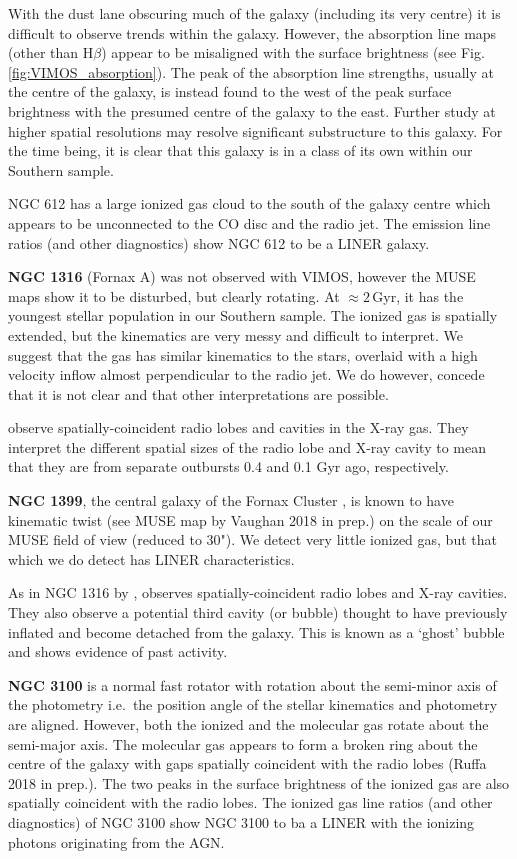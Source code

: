 With the dust lane obscuring much of the galaxy (including its very centre) it is difficult to observe trends within the galaxy. However, the absorption line maps (other than H$\beta$) appear to be misaligned with the surface brightness (see Fig.\,\ref{fig:VIMOS_absorption}). The peak of the absorption line strengths, usually at the centre of the galaxy, is instead found to the west of the peak surface brightness with the presumed centre of the galaxy to the east. Further study at higher spatial resolutions may resolve significant substructure to this galaxy. For the time being, it is clear that this galaxy is in a class of its own within our Southern sample. 

NGC 612 has a large ionized gas cloud to the south of the galaxy centre which appears to be unconnected to the CO disc and the radio jet. The emission line ratios (and other diagnostics) show NGC 612 to be a LINER galaxy. 

\textbf{NGC 1316} (Fornax A) was not observed with VIMOS, however the MUSE maps show it to be disturbed, but clearly rotating. At $\approx 2$\,Gyr, it has the youngest stellar population in our Southern sample. The ionized gas is spatially extended, but the kinematics are very messy and difficult to interpret. We suggest that the gas has similar kinematics to the stars, overlaid with a high velocity inflow almost perpendicular to the radio jet. We do however, concede that it is not clear and that other interpretations are possible. 

\citet{Lanz2010} observe spatially-coincident radio lobes and cavities in the X-ray gas. They interpret the different spatial sizes of the radio lobe and X-ray cavity to mean that they are from separate outbursts 0.4 and 0.1 Gyr ago, respectively.

\textbf{NGC 1399}, the central galaxy of the Fornax Cluster \citep{Jordan2007}, is known to have kinematic twist (see MUSE map by Vaughan 2018 in prep.) on the scale of our MUSE field of view (reduced to 30"). We detect very little ionized gas, but that which we do detect has LINER characteristics. 

As in NGC 1316 by \citet{Lanz2010}, \citet{Su2017} observes spatially-coincident radio lobes and X-ray cavities. They also observe a potential third cavity (or bubble) thought to have previously inflated and become detached from the galaxy. This is known as a `ghost' bubble and shows evidence of past activity.

\textbf{NGC 3100} is a normal fast rotator with rotation about the semi-minor axis of the photometry i.e.\ the position angle of the stellar kinematics and photometry are aligned. However, both the ionized and the molecular gas rotate about the semi-major axis. The molecular gas appears to form a broken ring about the centre of the galaxy with gaps spatially coincident with the radio lobes (Ruffa 2018 in prep.). The two peaks in the surface brightness of the ionized gas are also spatially coincident with the radio lobes. The ionized gas line ratios (and other diagnostics) of NGC 3100 show NGC 3100 to ba a LINER with the ionizing photons originating from the AGN.


